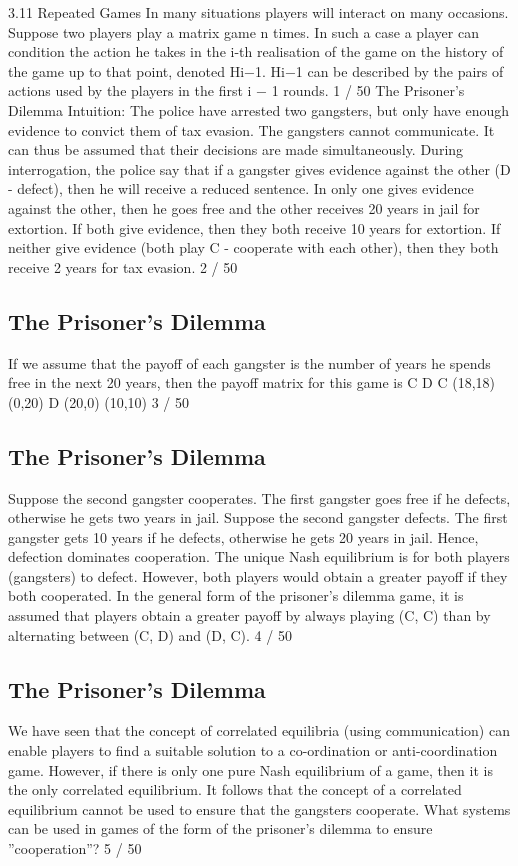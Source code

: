 \documentclass[]{report}
\begin{document}
3.11 Repeated Games
In many situations players will interact on many occasions.
Suppose two players play a matrix game n times.
In such a case a player can condition the action he takes in the i-th
realisation of the game on the history of the game up to that
point, denoted Hi−1.
Hi−1 can be described by the pairs of actions used by the players in
the first i − 1 rounds.
1 / 50
The Prisoner’s Dilemma
Intuition: The police have arrested two gangsters, but only have
enough evidence to convict them of tax evasion. The gangsters
cannot communicate. It can thus be assumed that their decisions
are made simultaneously.
During interrogation, the police say that if a gangster gives
evidence against the other (D - defect), then he will receive a
reduced sentence.
In only one gives evidence against the other, then he goes free and
the other receives 20 years in jail for extortion.
If both give evidence, then they both receive 10 years for extortion.
If neither give evidence (both play C - cooperate with each other),
then they both receive 2 years for tax evasion.
2 / 50
\subsection{The Prisoner’s Dilemma}
If we assume that the payoff of each gangster is the number of
years he spends free in the next 20 years, then the payoff matrix
for this game is
C D
C (18,18) (0,20)
D (20,0) (10,10)
3 / 50
\subsection{The Prisoner’s Dilemma}
Suppose the second gangster cooperates. The first gangster goes
free if he defects, otherwise he gets two years in jail.
Suppose the second gangster defects. The first gangster gets 10
years if he defects, otherwise he gets 20 years in jail.
Hence, defection dominates cooperation. The unique Nash
equilibrium is for both players (gangsters) to defect.
However, both players would obtain a greater payoff if they both
cooperated.
In the general form of the prisoner’s dilemma game, it is assumed
that players obtain a greater payoff by always playing (C, C) than
by alternating between (C, D) and (D, C).
4 / 50
\subsection{The Prisoner’s Dilemma}
We have seen that the concept of correlated equilibria (using
communication) can enable players to find a suitable solution to a
co-ordination or anti-coordination game.
However, if there is only one pure Nash equilibrium of a game,
then it is the only correlated equilibrium.
It follows that the concept of a correlated equilibrium cannot be
used to ensure that the gangsters cooperate.
What systems can be used in games of the form of the prisoner’s
dilemma to ensure ”cooperation”?
5 / 50
\end{document}
